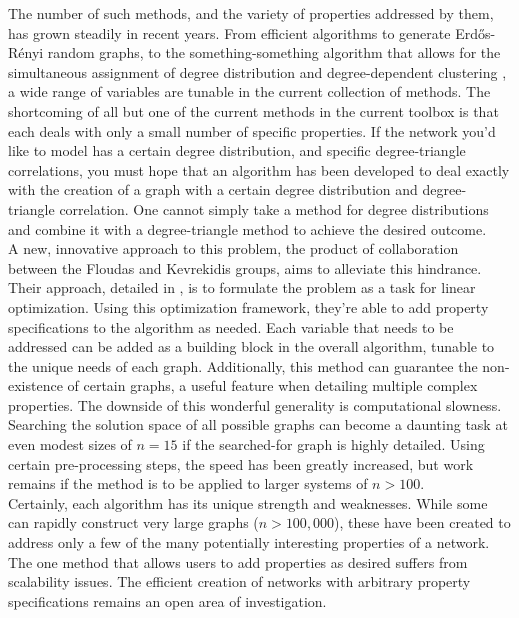 \documentclass[11pt]{article}
\begin{document}
The number of such methods, and the variety of properties addressed by them, has grown steadily in recent years. From efficient algorithms to generate Erd\H{o}s-R\'{e}nyi random graphs, to the something-something algorithm that allows for the simultaneous assignment of degree distribution and degree-dependent clustering \cite{efficentAlgsRG} \cite{the something somethig paper}, a wide range of variables are tunable in the current collection of methods. The shortcoming of all but one of the current methods in the current toolbox is that each deals with only a small number of specific properties. If the network you'd like to model has a certain degree distribution, and specific degree-triangle correlations, you must hope that an algorithm has been developed to deal exactly with the creation of a graph with a certain degree distribution and degree-triangle correlation. One cannot simply take a method for degree distributions and combine it with a degree-triangle method to achieve the desired outcome. \vspace{1mm}\\
A new, innovative approach to this problem, the product of collaboration between the Floudas and Kevrekidis groups, aims to alleviate this hindrance. Their approach, detailed in \cite{karthiksOptim}, is to formulate the problem as a task for linear optimization. Using this optimization framework, they're able to add property specifications to the algorithm as needed. Each variable that needs to be addressed can be added as a building block in the overall algorithm, tunable to the unique needs of each graph. Additionally, this method can guarantee the non-existence of certain graphs, a useful feature when detailing multiple complex properties. The downside of this wonderful generality is computational slowness. Searching the solution space of all possible graphs can become a daunting task at even modest sizes of $n=15$ if the searched-for graph is highly detailed. Using certain pre-processing steps, the speed has been greatly increased, but work remains if the method is to be applied to larger systems of $n>100$. \\
Certainly, each algorithm has its unique strength and weaknesses. While some can rapidly construct very large graphs ($n>100,000$), these have been created to address only a few of the many potentially interesting properties of a network. The one method that allows users to add properties as desired suffers from scalability issues. The efficient creation of networks with arbitrary property specifications remains an open area of investigation.
\end{document}
